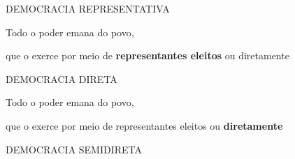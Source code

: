 \documentclass{Alexandre}
\begin{document}
\begin{frame}{DEMOCRACIA REPRESENTATIVA}

    \begin{center}
        \Large Todo o poder emana do povo,
        
        \vspace{2cm}
        
        \Large que o exerce por meio de \textbf{representantes eleitos} ou diretamente
    \end{center}

\end{frame}


\begin{frame}{DEMOCRACIA DIRETA}

    \begin{center}
        \Large Todo o poder emana do povo,
        
        \vspace{2cm}
        
        \Large que o exerce por meio de representantes eleitos ou \textbf{diretamente}
    \end{center}

\end{frame}


\begin{frame}{DEMOCRACIA SEMIDIRETA}

\end{frame}
\end{document}
